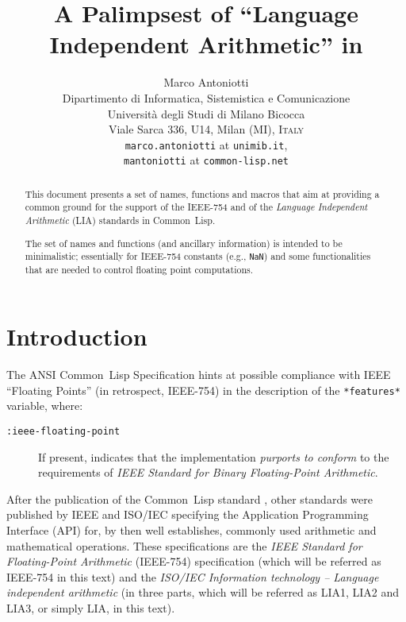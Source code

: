 \documentclass[10pt,fleqn]{article}
\title{
\LARGE{\bfseries A Palimpsest of ``Language Independent Arithmetic'' in \CL{}}}
\author{
  Marco Antoniotti\\
  Dipartimento di Informatica, Sistemistica e Comunicazione\\
  Universit\`{a} degli Studi di Milano Bicocca\\
  Viale Sarca 336, U14, Milan (MI), \textsc{Italy}\\[2mm]
  \texttt{marco.antoniotti} at \texttt{unimib.it},\\
  \texttt{mantoniotti} at \texttt{common-lisp.net}}
\newcommand{\CL}{\textsf{Common~Lisp}}
\newcommand{\code}[1]{\texttt{#1}}
\newcommand{\IEEEFPStd}{IEEE-754}
\begin{document}
\maketitle


\begin{abstract}
  This document presents a set of names, functions and macros that aim
  at providing a common ground for the support of the \IEEEFPStd{}
  \cite{2008:IEEE-754} and of the \emph{Language Independent
    Arithmetic} (LIA) standards \cite{2012:LIA1,2001:LIA2,2004:LIA3}
  in \CL{}.

  The set of names and functions (and ancillary information) is
  intended to be minimalistic; essentially for \IEEEFPStd{} constants
  (e.g., \code{NaN}) and some functionalities that are needed to
  control floating point computations.
\end{abstract}

\newpage

\tableofcontents

\newpage

\section{Introduction}

The ANSI \CL{} Specification \cite{1996:ANSIHyperSpec} hints at possible
compliance with IEEE ``Floating Points'' (in retrospect, \IEEEFPStd{}) in
the description of the \code{*features*} variable, where:
\begin{description}
\item[\code{:ieee-floating-point}]
  If present, indicates that the
  implementation \emph{purports to conform}  to the requirements of
  \emph{IEEE Standard for Binary Floating-Point Arithmetic}. 
\end{description}

After the publication of the \CL{} standard \cite{1994:ANSICL}, other
standards were published by IEEE and ISO/IEC specifying the
Application Programming Interface (API) for, by then well establishes,
commonly used arithmetic and mathematical operations.  These
specifications are the \emph{IEEE Standard for Floating-Point
  Arithmetic} (\IEEEFPStd{}) \cite{2008:IEEE-754} specification (which
will be referred as \IEEEFPStd{} in this text) and the \emph{ISO/IEC
  Information technology -- Language independent arithmetic}
\cite{2012:LIA1,2001:LIA2,2004:LIA3} (in three parts, which will be
referred as LIA1, LIA2 and LIA3, or simply LIA, in this text).
\end{document}
